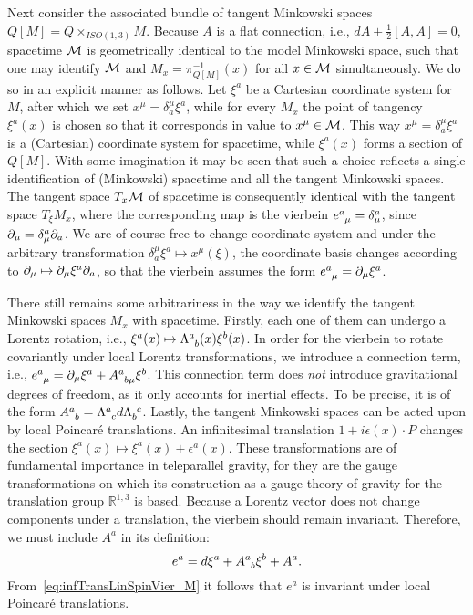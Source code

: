 \documentclass[
final,
11pt,
a4paper,
DIV=11,
headinclude=true,
footinclude=false,
bibliography=totoc,
twoside=true,  %
BCOR=5mm
]{scrbook}
\begin{document}
Next consider the associated bundle of tangent Minkowski spaces 
$Q[M] = Q \times_{ISO(1,3)} M$. Because $A$ is a flat connection, 
i.e., $dA + \tfrac{1}{2} [A,A] = 0$, spacetime $\mathcal{M}$ is 
geometrically identical to the model Minkowski space, such that 
one may identify $\mathcal{M}$ and $M_x = \pi_{Q[M]}^{-1}(x)$ for all 
$x \in \mathcal{M}$ simultaneously.  We do so in an explicit manner as 
follows.  Let $\xi^a$ be a Cartesian coordinate system for $M$, 
after which we set $x^\mu = \delta^\mu_a \xi^a$, while for every 
$M_x$ the point of tangency $\xi^a(x)$ is chosen so that it 
corresponds in value to $x^\mu\in \mathcal{M}$. This way $x^\mu 
= \delta^\mu_a \xi^a$ is a (Cartesian) coordinate system for 
spacetime, while $\xi^a(x)$ forms a section of $Q[M]$. With some 
imagination it may be seen that such a choice reflects a single 
identification of (Minkowski) spacetime and all the tangent 
Minkowski spaces. The tangent space $T_x\mathcal{M}$ of spacetime is 
consequently identical with the tangent space $T_{\xi}M_x$, where 
the corresponding map is the vierbein $e\ind{^a_\mu} 
= \delta^a_\mu$, since $\partial_\mu = \delta^a_\mu \partial_a$. We are of 
course free to change coordinate system and under the arbitrary 
transformation $\delta^\mu_a \xi^a \mapsto x^\mu(\xi)$, the 
coordinate basis changes according to $\partial_\mu \mapsto \partial_\mu 
\xi^a \partial_a$, so that the vierbein assumes the form 
$e\ind{^a_\mu} = \pd_\mu \xi^a$.

There still remains some arbitrariness in the way we identify the 
tangent Minkowski spaces $M_x$ with spacetime.  Firstly, each one 
of them can undergo a Lorentz rotation, i.e.,
$\xi^a(x) \mapsto \Lambda\ind{^a_b}(x) \xi^b(x)$. In order for 
the vierbein to rotate covariantly under local Lorentz 
transformations, we introduce a connection term, i.e., 
$e\ind{^a_\mu} = \pd_\mu\xi^a + A\ind{^a_{b\mu}}\xi^b$. This 
connection term does \emph{not} introduce gravitational degrees 
of freedom, as it only accounts for inertial effects. To be 
precise, it is of the form $A\ind{^a_b} = \Lambda\ind{^a_c} 
d\Lambda\ind{_b^c}$.  Lastly, the tangent Minkowski spaces can be 
acted upon by local Poincar\'e translations. An infinitesimal 
translation $1 + i\epsilon(x)\cdot P$ changes the section 
$\xi^a(x) \mapsto \xi^a(x) + \epsilon^a(x)$. These 
transformations are of fundamental importance in teleparallel 
gravity, for they are the gauge transformations on which its 
construction as a gauge theory of gravity for the translation 
group $\mathds{R}^{1,3}$ is based.  Because a Lorentz vector does 
not change components under a translation, the vierbein should 
remain invariant. Therefore, we must include $A^a$ in its 
definition:
\begin{equation}
\label{eq:nonlin_vier_RC}
  e^a = d\xi^a + A\ind{^a_b}\xi^b + A^a.
\end{equation}
From~\eqref{eq:infTransLinSpinVier_M} it follows that $e^a$ is 
invariant under local Poincar\'e translations.
\end{document}

